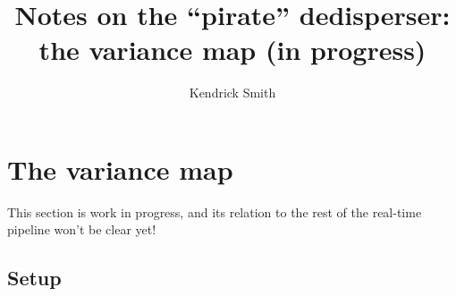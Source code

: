 \documentclass{article}
\title{Notes on the ``pirate'' dedisperser: the variance map (in progress)}
\author{Kendrick Smith}
\numberwithin{equation}{section}   %
\begin{document}
\maketitle

\tableofcontents

\setlength{\parskip}{2.5pt}  %

\clearpage

\section{The variance map}
\label{sec:variance_map}

This section is work in progress, and its relation to the rest of the real-time
pipeline won't be clear yet!

\subsection{Setup}
\label{ssec:variance_map_setup}
\end{document}
